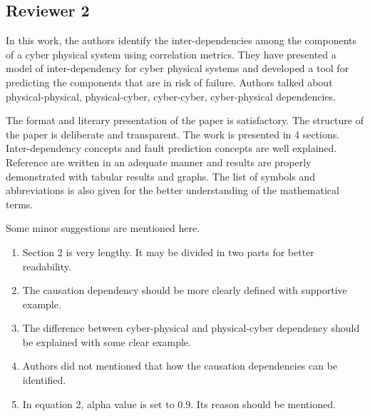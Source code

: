 \documentclass{article}
\begin{document}
\subsection{Reviewer 2}
\label{sec:reviewer:r2}
In this work, the authors identify the inter-dependencies among the components of a cyber physical system using correlation metrics. They have presented a model of inter-dependency for cyber physical systems and developed a tool for predicting the components that are in risk of failure. Authors talked about physical-physical, physical-cyber, cyber-cyber, cyber-physical dependencies.

The format and literary presentation of the paper is satisfactory. The structure of the paper is deliberate and transparent. The work is presented in 4 sections. Inter-dependency concepts and fault prediction concepts are well explained. Reference are written in an adequate manner and results are properly demonstrated with tabular results and graphs. The list of symbols and abbreviations is also given for the better understanding of the mathematical terms.

Some minor suggestions are mentioned here.

\begin{enumerate}
  \item Section 2 is very lengthy. It may be divided in two parts for better readability.
  \item The causation dependency should be more clearly defined with supportive example.
  \item The difference between cyber-physical and physical-cyber dependency should be explained with some clear example.
  \item Authors did not mentioned that how the causation dependencies can be identified.
  \item In equation 2, alpha value is set to 0.9. Its reason should be mentioned.
\end{enumerate}
\end{document}
